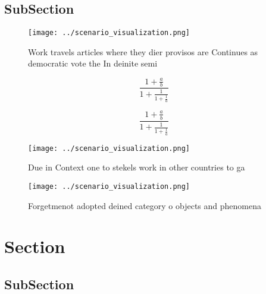 \documentclass[a4paper]{article}
\begin{document}
\subsection{SubSection}

\begin{figure}
\centering
\texttt{[image: ../scenario\_visualization.png]}
\caption{Work travels articles where they dier provisos are Continues as democratic vote the In deinite semi
}
\end{figure}
 
\[ \frac{1+\frac{a}{b}}{1+\frac{1}{1+\frac{1}{a}}} \]

\[ \frac{1+\frac{a}{b}}{1+\frac{1}{1+\frac{1}{a}}} \]

\begin{figure}
\centering
\texttt{[image: ../scenario\_visualization.png]}
\caption{Due in Context one to stekels work in other countries to ga
}
\end{figure}
 
\begin{figure}
\centering
\texttt{[image: ../scenario\_visualization.png]}
\caption{Forgetmenot adopted deined category o objects and phenomena
}
\end{figure}
 
\section{Section}

\subsection{SubSection}
\end{document}
